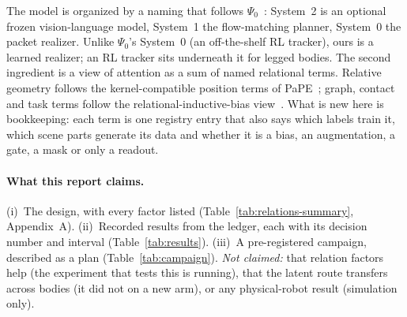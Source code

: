 \documentclass[10pt,twocolumn]{article}
\begin{document}
The model is organized by a naming that follows $\Psi_0$~\cite{psi0}: System~2 is an optional frozen vision-language model, System~1 the flow-matching planner, System~0 the packet realizer. Unlike $\Psi_0$'s System~0 (an off-the-shelf RL tracker), ours is a learned realizer; an RL tracker sits underneath it for legged bodies. The second ingredient is a view of attention as a sum of named relational terms. Relative geometry follows the kernel-compatible position terms of PaPE~\cite{pape}; graph, contact and task terms follow the relational-inductive-bias view~\cite{battaglia}. What is new here is bookkeeping: each term is one registry entry that also says which labels train it, which scene parts generate its data and whether it is a bias, an augmentation, a gate, a mask or only a readout.

\paragraph{What this report claims.} (i)~The design, with every factor listed (Table~\ref{tab:relations-summary}, Appendix~A). (ii)~Recorded results from the ledger, each with its decision number and interval (Table~\ref{tab:results}). (iii)~A pre-registered campaign, described as a plan (Table~\ref{tab:campaign}). \emph{Not claimed:} that relation factors help (the experiment that tests this is running), that the latent route transfers across bodies (it did not on a new arm), or any physical-robot result (simulation only).
\end{document}
